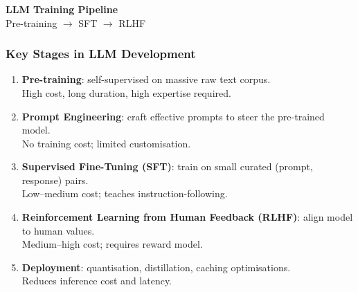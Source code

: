 
\begin{frame}[fragile]\frametitle{}
\begin{center}
{\Large \textbf{LLM Training Pipeline}}\\[0.5em]
{\normalsize Pre-training $\rightarrow$ SFT $\rightarrow$ RLHF}
\end{center}
\end{frame}

\begin{frame}[fragile]\frametitle{Key Stages in LLM Development}
\begin{enumerate}
\item \textbf{Pre-training}: self-supervised on massive raw text corpus.\\
  {\small High cost, long duration, high expertise required.}
\item \textbf{Prompt Engineering}: craft effective prompts to steer the pre-trained model.\\
  {\small No training cost; limited customisation.}
\item \textbf{Supervised Fine-Tuning (SFT)}: train on small curated (prompt, response) pairs.\\
  {\small Low–medium cost; teaches instruction-following.}
\item \textbf{Reinforcement Learning from Human Feedback (RLHF)}: align model to human values.\\
  {\small Medium–high cost; requires reward model.}
\item \textbf{Deployment}: quantisation, distillation, caching optimisations.\\
  {\small Reduces inference cost and latency.}
\end{enumerate}
\end{frame}

